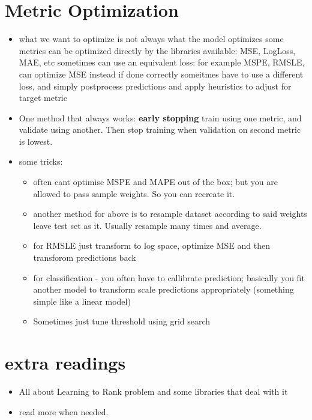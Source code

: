 \documentclass[a4paper]{report}
\begin{document}
\section{Metric Optimization}
\begin{itemize}
  \item what we want to optimize is not always what the model optimizes
    \subitem some metrics can be optimized directly by the libraries available: MSE, LogLoss, MAE,  etc
    \subitem sometimes can use an equivalent loss: for example MSPE, RMSLE, can optimize MSE instead if done correctly	
    \subitem someitmes have to use a different loss, and simply postprocess predictions and apply heuristics to adjust for target metric
  \item One method that always works: {\bf early stopping}
    \subitem train using one metric, and validate using another. Then stop training when validation on second metric is lowest.
  \item some tricks:
    \begin{itemize}
      \item often cant optimise MSPE and MAPE out of the box; but you are allowed to pass sample weights. So you can recreate it.
      \item another method for above is to resample dataset according to said weights 
	\subitem leave test set as it. Usually resample many times and average.
      \item for RMSLE just transform to log space, optimize MSE and then transforom predictions back
      \item for classification - you often have to callibrate prediction; basically you fit another model to transform scale predictions appropriately (something simple like a linear model)
      \item Sometimes just tune threshold using grid search
    \end{itemize}
\end{itemize}

\section{extra readings}
\begin{itemize}
  \item All about Learning to Rank problem and some libraries that deal with it
  \item read more when needed.
\end{itemize}
\end{document}
